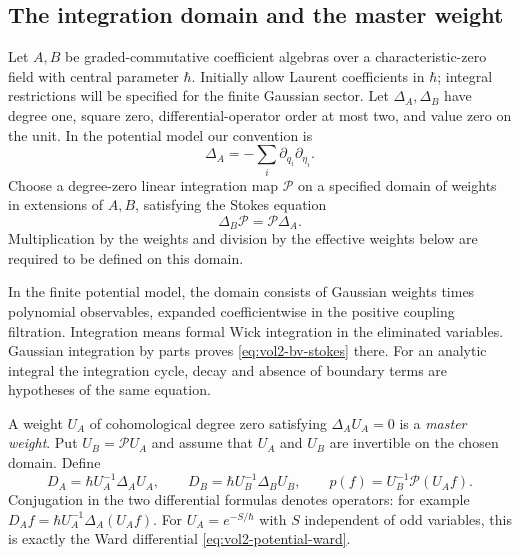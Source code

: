 \subsection{The integration domain and the master weight}

Let $A,B$ be graded-commutative coefficient algebras over a
characteristic-zero field with central parameter $\hbar$.
Initially allow Laurent coefficients in $\hbar$; integral
restrictions will be specified for the finite Gaussian sector.
Let $\Delta_A,\Delta_B$ have degree one, square zero,
differential-operator order at most two, and value zero on
the unit. In the potential model our convention is
\[
 \Delta_A=-\sum_i\partial_{q_i}\partial_{\eta_i}.
\]
Choose a degree-zero linear integration map $\mathcal P$
on a specified domain of weights in extensions of $A,B$, satisfying
the Stokes equation
\begin{equation}\label{eq:vol2-bv-stokes}
 \Delta_B\mathcal P=\mathcal P\Delta_A.
\end{equation}
Multiplication by the weights and division by the effective
weights below are required to be defined on this domain.

In the finite potential model, the domain consists of Gaussian
weights times polynomial observables, expanded coefficientwise
in the positive coupling filtration. Integration means formal
Wick integration in the eliminated variables. Gaussian
integration by parts proves \eqref{eq:vol2-bv-stokes} there.
For an analytic integral the integration cycle, decay and
absence of boundary terms are hypotheses of the same equation.

A weight $U_A$ of cohomological degree zero satisfying
$\Delta_AU_A=0$ is a \emph{master weight}. Put
$U_B=\mathcal P U_A$ and assume that $U_A$ and $U_B$
are invertible on the chosen domain. Define
\begin{equation}\label{eq:vol2-normalized-bv-map}
 D_A=\hbar U_A^{-1}\Delta_AU_A,
 \qquad D_B=\hbar U_B^{-1}\Delta_BU_B,
 \qquad p(f)=U_B^{-1}\mathcal P(U_Af).
\end{equation}
Conjugation in the two differential formulas denotes
operators: for example $D_Af=\hbar U_A^{-1}\Delta_A(U_Af)$.
For $U_A=e^{-S/\hbar}$ with $S$ independent of odd variables,
this is exactly the Ward differential
\eqref{eq:vol2-potential-ward}.


